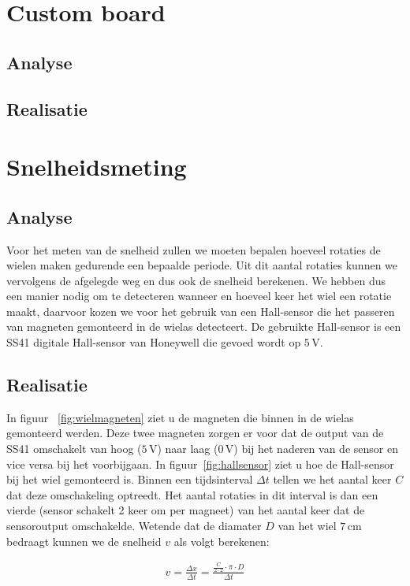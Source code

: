 \documentclass[11pt,a4paper]{report}
\begin{document}
\section{Custom board}
\subsection{Analyse}
\subsection{Realisatie}

\section{Snelheidsmeting}
\subsection{Analyse}
Voor het meten van de snelheid zullen we moeten bepalen hoeveel rotaties de wielen maken gedurende een bepaalde periode. Uit dit aantal rotaties kunnen we vervolgens de afgelegde weg en dus ook de snelheid berekenen. We hebben dus een manier nodig om te detecteren wanneer en hoeveel keer het wiel een rotatie maakt, daarvoor kozen we voor het gebruik van een Hall-sensor die het passeren van magneten gemonteerd in de wielas detecteert. De gebruikte Hall-sensor is een SS41 digitale Hall-sensor van Honeywell die gevoed wordt op $5\,\mathrm{V}$.	
\subsection{Realisatie}
In figuur ~\vref{fig:wielmagneten} ziet u de magneten die binnen in de wielas gemonteerd werden. Deze twee magneten zorgen er voor dat de output van de SS41 omschakelt van hoog ($5\,\mathrm{V}$) naar laag ($0\,\mathrm{V}$) bij het naderen van de sensor en vice versa bij het voorbijgaan. In figuur~\vref{fig:hallsensor} ziet u hoe de Hall-sensor bij het wiel gemonteerd is. Binnen een tijdsinterval $\Delta t$ tellen we het aantal keer $C$ dat deze omschakeling optreedt. Het aantal rotaties in dit interval is dan een vierde (sensor schakelt 2 keer om per magneet) van het aantal keer dat de sensoroutput omschakelde. Wetende dat de diamater $D$ van het wiel $7\,\mathrm{cm}$ bedraagt kunnen we de snelheid $v$ als volgt berekenen:

\begin{gather*}
v=\frac{\Delta x}{\Delta t} = \frac{\frac{C}{2\cdot 2}\cdot\pi\cdot D}{\Delta t}
\end{gather*}
\end{document}
